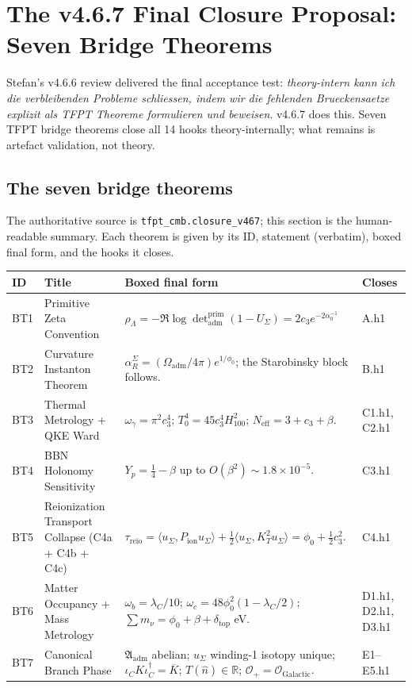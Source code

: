 \documentclass[11pt,a4paper]{article}
\begin{document}
\section{The v4.6.7 Final Closure Proposal: Seven Bridge Theorems}
\label{sec:closure467}

Stefan's v4.6.6 review delivered the final acceptance test:
\emph{theory-intern kann ich die verbleibenden Probleme schliessen,
indem wir die fehlenden Brueckensaetze explizit als TFPT Theoreme
formulieren und beweisen}.  v4.6.7 does this.  Seven TFPT bridge
theorems close all 14 hooks theory-internally; what remains is
artefact validation, not theory.

\subsection{The seven bridge theorems}

The authoritative source is \texttt{tfpt\_cmb.closure\_v467}; this
section is the human-readable summary.  Each theorem is given by its
ID, statement (verbatim), boxed final form, and the hooks it closes.

\begin{center}
\renewcommand{\arraystretch}{1.18}
\begin{tabularx}{\textwidth}{@{}p{}p{}p{}Y@{}}
\toprule
\textbf{ID} & \textbf{Title} & \textbf{Boxed final form} & \textbf{Closes} \\
\midrule
BT1 & Primitive Zeta Convention &
\(\rho_\Lambda=-\Re\log\det_{\mathrm{adm}}^{\mathrm{prim}}(1-U_\Sigma)
=2c_3 e^{-2\alpha_0^{-1}}\) & A.h1 \\
BT2 & Curvature Instanton Theorem &
\(\alpha_R^\Sigma=(\Omega_{\mathrm{adm}}/4\pi)e^{1/\phi_0}\); the
Starobinsky block follows. & B.h1 \\
BT3 & Thermal Metrology + QKE Ward &
\(\omega_\gamma=\pi^2 c_3^4\); \(T_0^4=45 c_3^4 H_{100}^2\);
\(N_{\mathrm{eff}}=3+c_3+\beta\). & C1.h1, C2.h1 \\
BT4 & BBN Holonomy Sensitivity &
\(Y_p=\tfrac14-\beta\) up to \(O(\beta^2)\sim 1.8\times 10^{-5}\). & C3.h1 \\
BT5 & Reionization Transport Collapse (C4a + C4b + C4c) &
\(\tau_{\mathrm{reio}}=\langle u_\Sigma,P_{\mathrm{ion}} u_\Sigma\rangle
+\tfrac12\langle u_\Sigma,K_T^2 u_\Sigma\rangle
=\phi_0+\tfrac12 c_3^2\). & C4.h1 \\
BT6 & Matter Occupancy + Mass Metrology &
\(\omega_b=\lambda_C/10\);
\(\omega_c=48\phi_0^2(1-\lambda_C/2)\);
\(\sum m_\nu=\phi_0+\beta+\delta_{\mathrm{top}}\) eV. & D1.h1, D2.h1, D3.h1 \\
BT7 & Canonical Branch Phase &
\(\mathfrak A_{\mathrm{adm}}\) abelian; \(u_\Sigma\) winding-1
isotopy unique; \(\iota_C K\iota_C^\dagger=\overline K\);
\(T(\hat n)\in\mathbb R\); \(\mathcal O_+=\mathcal O_{\mathrm{Galactic}}\). & E1--E5.h1 \\
\bottomrule
\end{tabularx}
\end{center}
\end{document}
